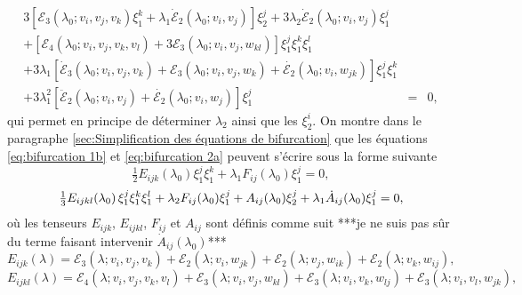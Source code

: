 \documentclass{article}
\newcommand{\nocomma}{}
\begin{document}
\begin{eqnarray}
  3 [\mathcal{E}_3 (\lambda_0 ; v_i, v_j, v_k) \xi_1^k + \lambda_1
  \dot{\mathcal{E}}_2 (\lambda_0 ; v_i, v_j)] \xi_2^j + 3 \lambda_2
  \dot{\mathcal{E}}_2 (\lambda_0 ; v_i, v_j) \xi_1^j &  &  \nonumber\\
  + [\mathcal{E}_4 (\lambda_0 ; v_i, v_j, v_k, v_l) + 3\mathcal{E}_3
  (\lambda_0 ; v_i, v_j, w_{k \nocomma l})] \xi_1^j \xi_1^k \xi_1^l &  &
  \nonumber\\
  + 3 \lambda_1  [\dot{\mathcal{E}}_3 (\lambda_0 ; v_i, v_j, v_k)
  +\mathcal{E}_3 (\lambda_0 ; v_i, v_j, w_k) + \dot{\mathcal{E}_2} (\lambda_0
  ; v_i, w_{j \nocomma k})] \xi_1^j \xi_1^k &  &  \nonumber\\
  + 3 \lambda_1^2  [\ddot{\mathcal{E}}_2 (\lambda_0 ; v_i, v_j) +
  \dot{\mathcal{E}_2} (\lambda_0 ; v_i, w_j)] \xi_1^j & = & 0,
  \label{eq:bifurcation 2a}
\end{eqnarray}
qui permet en principe de déterminer $\lambda_2$ ainsi que les $\xi_2^i$.
On montre dans le paragraphe \ref{sec:Simplification des équations de
bifurcation} que les équations \eqref{eq:bifurcation 1b} et
\eqref{eq:bifurcation 2a} peuvent s'écrire sous la forme suivante
\begin{equation}
  \label{eq:bifurcation 1c} \tfrac{1}{2} E_{i \nocomma j \nocomma k}
  (\lambda_0) \xi_1^j \xi_1^k + \lambda_1 F_{i \nocomma j} (\lambda_0) \xi_1^j
  = 0,
\end{equation}
\begin{equation}
  \label{eq:bifurcation 2b} \tfrac{1}{3} E_{i \nocomma j \nocomma k \nocomma
  l} (\lambda_0)  \hspace{0.17em} \xi_1^j \xi_1^k \xi_1^l + \lambda_2 F_{i
  \nocomma j} (\lambda_0) \xi_1^j + A_{i \nocomma j} (\lambda_0) \xi_2^j +
  \lambda_1  \dot{A}_{i \nocomma j} (\lambda_0) \xi_1^j = 0,
\end{equation}
où les tenseurs $E_{i \nocomma j \nocomma k}$, $E_{i \nocomma j \nocomma k
\nocomma l}$, $F_{i \nocomma j}$ et $A_{i \nocomma j}$ sont définis comme
suit ***je ne suis pas sûr du terme faisant intervenir $\dot{A}_{i
\nocomma j} (\lambda_0)$***
\begin{equation}
  \label{eq:def Eijk} E_{i \nocomma j \nocomma k} (\lambda) =\mathcal{E}_3
  (\lambda ; v_i, v_j, v_k) +\mathcal{E}_2 (\lambda  ; v_i, w_{j \nocomma k})
  +\mathcal{E}_2 (\lambda ; v_j, w_{i \nocomma k}) +\mathcal{E}_2 (\lambda ;
  v_k, w_{i \nocomma j}),
\end{equation}
\begin{equation}
  \label{eq:def Eijkl} E_{i \nocomma j \nocomma k \nocomma l} (\lambda)
  =\mathcal{E}_4 (\lambda  ; v_i, v_j, v_k, v_l) +\mathcal{E}_3 (\lambda ;
  v_i, v_j, w_{k \nocomma l}) +\mathcal{E}_3 (\lambda ; v_i, v_k, w_{l
  \nocomma j}) +\mathcal{E}_3 (\lambda ; v_i, v_l, w_{j \nocomma k}),
\end{equation}
\end{document}
